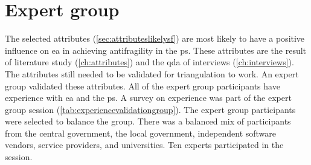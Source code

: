 \chapter{Expert group}
\label{ch:expertgroup}
\setcounter{footnote}{0}
The selected \glspl{attribute} (\cref{sec:attributeslikelysf}) are most likely to have a positive influence on \acrshort{ea} in achieving \gls{antifragility} in the \gls{ps}. These attributes are the result of literature study (\cref{ch:attributes}) and the \acrfull{qda} of interviews (\cref{ch:interviews}). The \glspl{attribute} still needed to be validated for \gls{triangulation} to work. An expert group validated these \glspl{attribute}. All of the expert group participants have experience with \acrshort{ea} and the \gls{ps}. A survey on experience was part of the expert group session (\cref{tab:experiencevalidationgroup}). The expert group participants were selected to balance the group. There was a balanced mix of participants from the central government, the local government, independent software vendors, service providers, and universities. Ten experts participated in the session.

